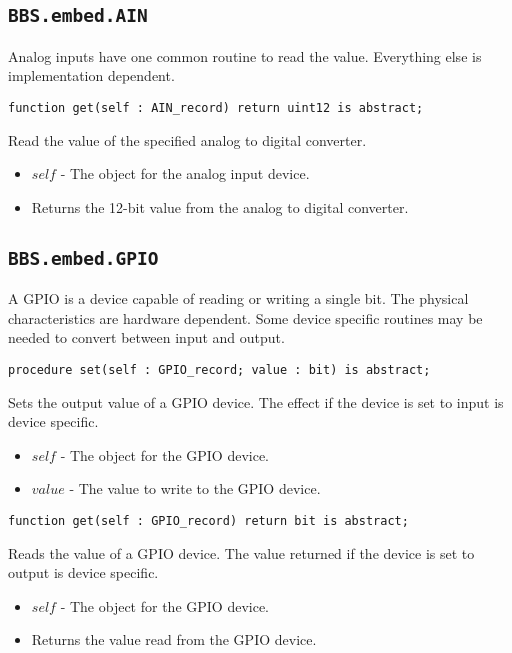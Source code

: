 \documentclass[10pt, openany]{book}
\newcommand{\indexfunc}[1]{\index[func]{#1}}
\newcommand{\package}[1]{\texttt{#1}}
\begin{document}
\subsection{\package{BBS.embed.AIN}}
Analog inputs have one common routine to read the value.  Everything else is implementation dependent.
\begin{lstlisting}
function get(self : AIN_record) return uint12 is abstract;
\end{lstlisting}
\indexfunc{get}
Read the value of the specified analog to digital converter.
\begin{itemize}
  \item $self$ - The object for the analog input device.
  \item Returns the 12-bit value from the analog to digital converter.
\end{itemize}

\subsection{\package{BBS.embed.GPIO}}
A GPIO is a device capable of reading or writing a single bit.  The physical characteristics are hardware dependent.  Some device specific routines may be needed to convert between input and output.

\begin{lstlisting}
procedure set(self : GPIO_record; value : bit) is abstract;
\end{lstlisting}
\indexfunc{set}
Sets the output value of a GPIO device.  The effect if the device is set to input is device specific.
\begin{itemize}
  \item $self$ - The object for the GPIO device.
  \item $value$ - The value to write to the GPIO device.
\end{itemize}

\begin{lstlisting}
function get(self : GPIO_record) return bit is abstract;
\end{lstlisting}
\indexfunc{get}
Reads the value of a GPIO device.  The value returned if the device is set to output is device specific.
\begin{itemize}
  \item $self$ - The object for the GPIO device.
  \item Returns the value read from the GPIO device.
\end{itemize}
\end{document}
